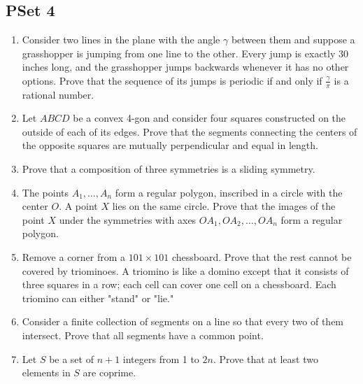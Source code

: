 \documentclass[../main.tex]{subfiles}
\begin{document}
\chapter{}
\section{PSet 4}
\begin{enumerate}
    \item {}Consider two lines in the plane with the angle $\gamma$ between them and suppose a grasshopper is jumping from one line to the other. Every jump is exactly 30 inches long, and the grasshopper jumps backwards whenever it has no other options. Prove that the sequence of its jumps is periodic if and only if $\frac{\gamma}{\pi}$ is a rational number.
    \item Let $ABCD$ be a convex 4-gon and consider four squares constructed on the outside of each of its edges. Prove that the segments connecting the centers of the opposite squares are mutually perpendicular and equal in length.
    \item Prove that a composition of three symmetries is a sliding symmetry.
    \item The points $A_1,\dots,A_n$ form a regular polygon, inscribed in a circle with the center $O$. A point $X$ lies on the same circle. Prove that the images of the point $X$ under the symmetries with axes $OA_1,OA_2,\dots,OA_n$ form a regular polygon.
    \item Remove a corner from a $101\times 101$ chessboard. Prove that the rest cannot be covered by triominoes. A triomino is like a domino except that it consists of three squares in a row; each cell can cover one cell on a chessboard. Each triomino can either "stand" or "lie."
    \item Consider a finite collection of segments on a line so that every two of them intersect. Prove that all segments have a common point.
    \item Let $S$ be a set of $n+1$ integers from 1 to $2n$. Prove that at least two elements in $S$ are coprime.
\end{enumerate}
\end{document}
